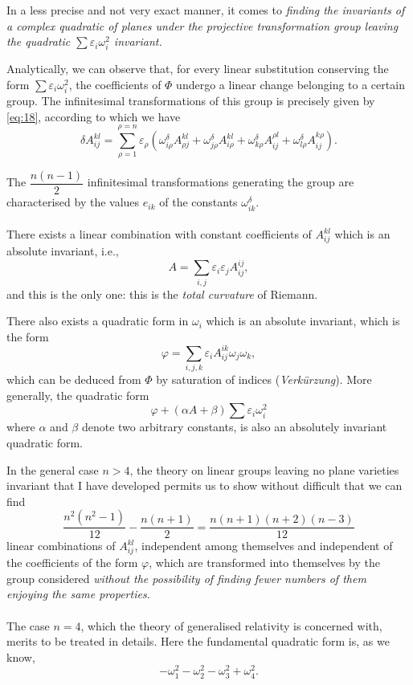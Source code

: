 \documentclass[leqno,12pt]{article}
\makeatletter
\let\old@phi\phi
\let\old@varphi\varphi
\let\old@epsilon\epsilon
\let\old@varepsilon\varepsilon
\let\phi\old@varphi
\let\varphi\old@phi
\let\epsilon\old@varepsilon
\let\varepsilon\old@epsilon
\theoremstyle{shape1}
\theoremstyle{shape0}
\theoremstyle{shape2}
\theoremstyle{definition}
\makeatother
\begin{document}
In a less precise and not very exact manner, it comes to \emph{finding the invariants of a complex quadratic of planes under the projective transformation group leaving the quadratic $\sum\epsilon_{i}\omega_{i}^{2}$ invariant.}

Analytically, we can observe that, for every linear substitution conserving the form $\sum\epsilon_{i}\omega_{i}^{2}$, the coefficients of $\Phi$ undergo a linear change belonging to a certain group. The infinitesimal transformations of this group is precisely given by \eqref{eq:18}, according to which we have
\[
\delta A^{kl}_{ij}=\sum_{\rho=1}^{\rho=n}\epsilon_{\rho}(\omega^{\delta}_{i\rho}A^{kl}_{\rho j}+\omega^{\delta}_{j\rho}A^{kl}_{i\rho}+\omega^{\delta}_{k\rho}A^{\rho l}_{ij}+\omega^{\delta}_{l\rho}A^{k\rho}_{ij}).
\]

The $\dfrac{n(n-1)}{2}$ infinitesimal transformations generating the group are characterised by the values $e_{ik}$ of the constants $\omega^{\delta}_{ik}$.

\paragraph{}
\label{sec:26}
There exists a linear combination with constant coefficients of $A^{kl}_{ij}$ which is an absolute invariant, i.e.,
\[
A=\sum_{i,j}\epsilon_{i}\epsilon_{j}A^{ij}_{ij},
\]
and this is the only one: this is the \emph{total curvature} of Riemann.

There also exists a quadratic form in $\omega_{i}$ which is an absolute invariant, which is the form
\[
\phi=\sum_{i,j,k}\epsilon_{i}A^{ik}_{ij}\omega_{j}\omega_{k},
\]
which can be deduced from $\Phi$ by saturation of indices (\emph{Verkürzung}). More generally, the quadratic form
\[
\phi+(\alpha A+\beta)\sum\epsilon_{i}\omega_{i}^{2}
\]
where $\alpha$ and $\beta$ denote two arbitrary constants, is also an absolutely invariant quadratic form.

In the general case $n>4$, the theory on linear groups leaving no plane varieties invariant that I have developed permits us to show without difficult that we can find
\[
\frac{n^{2}(n^{2}-1)}{12}-\frac{n(n+1)}{2}=\frac{n(n+1)(n+2)(n-3)}{12}
\]
linear combinations of $A^{kl}_{ij}$, independent among themselves and independent of the coefficients of the form $\phi$, which are transformed into themselves by the group considered \emph{without the possibility of finding fewer numbers of them enjoying the same properties.}

\paragraph{}
\label{sec:27}
The case $n=4$, which the theory of generalised relativity is concerned with, merits to be treated in details. Here the fundamental quadratic form is, as we know,
\[
-\omega_{1}^{2}-\omega_{2}^{2}-\omega_{3}^{2}+\omega_{4}^{2}.
\]
\end{document}
